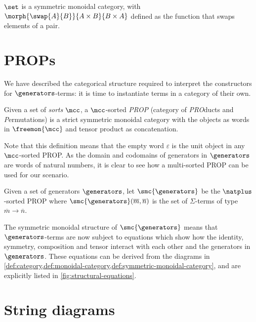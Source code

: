 \begin{example}
    \(\set\) is a symmetric monoidal category, with \(
        \morph{\swap{A}{B}}{A \times B}{B \times A}
    \) defined as the function that swaps elements of a pair.
\end{example}

\section{PROPs}

We have described the categorical structure required to interpret the
constructors for \(\generators\)-terms: it is time to instantiate terms in a
category of their own.

\begin{definition}
    Given a set of \emph{sorts} \(\mcc\), a \(\mcc\)-sorted \emph{PROP}
    (category of \emph{PRO}ducts and \emph{P}ermutations) is a strict symmetric
    monoidal category with the objects as words in \(\freemon{\mcc}\) and tensor
    product as concatenation.
\end{definition}

Note that this definition means that the empty word \(\varepsilon\) is the unit
object in any \(\mcc\)-sorted PROP.
As the domain and codomains of generators in \(\generators\) are words of
natural numbers, it is clear to see how a multi-sorted PROP can be used for our
scenario.

\begin{definition}
    Given a set of generators \(\generators\), let \(\smc{\generators}\) be the
    \(\natplus\)-sorted PROP where \(
        \smc{\generators}(\overline{m}, \overline{n})
    \) is the set of \(\Sigma\)-terms of type \(\overline{m} \to \overline{n}\).
\end{definition}

The symmetric monoidal structure of \(\smc{\generators}\) means that
\(\generators\)-terms are now subject to equations which show how the identity,
symmetry, composition and tensor interact with each other and the generators in
\(\generators\).
These equations can be derived from the diagrams in
\cref{def:category,def:monoidal-category,def:symmetric-monoidal-category}, and
are explicitly listed in \cref{fig:structural-equations}.



\section{String diagrams}

